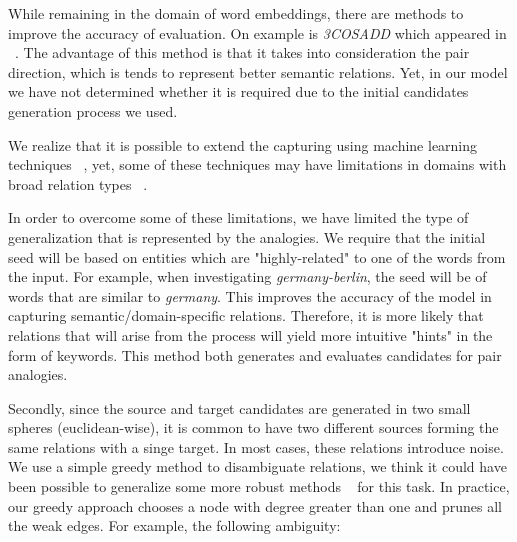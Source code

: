 \documentclass[11pt,a4paper]{article}
\begin{document}
While remaining in the domain of word embeddings, there are methods to improve the accuracy of evaluation. On example is \textit{3COSADD} which appeared in ~\cite{levy2014linguistic}. The advantage of this method is that it takes into consideration the pair direction, which is tends to represent better semantic relations. Yet, in our model we have not determined whether it is required due to the initial candidates generation process we used.

We realize that it is possible to extend the capturing using machine learning techniques ~\cite{drozd2016word}, yet, some of these techniques may have limitations in domains with broad relation types ~\cite{levy2015supervised}.

In order to overcome some of these limitations, we have limited the type of generalization that is represented by the analogies. We require that the initial seed will be based on entities which are "highly-related" to one of the words from the input. For example, when investigating \textit{germany-berlin}, the seed will be of words that are similar to \textit{germany}. This improves the accuracy of the model in capturing semantic/domain-specific relations. Therefore, it is more likely that relations that will arise from the process will yield more intuitive "hints" in the form of keywords. This method both generates and evaluates candidates for pair analogies.

Secondly, since the source and target candidates are generated in two small spheres (euclidean-wise), it is common to have two different sources forming the same relations with a singe target. In most cases, these relations introduce noise. We use a simple greedy method to disambiguate relations, we think it could have been possible to generalize some more robust methods ~\cite{daelemans1999introduction} for this task. In practice, our greedy approach chooses a node with degree greater than one and prunes all the weak edges. For example, the following ambiguity:

\end{document}
